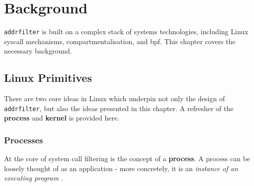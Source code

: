 \section{Background} \label{sec:background}



\texttt{addrfilter} is built on a complex stack of systems technologies,
including Linux syscall mechanisms, compartmentalisation, and \ac{bpf}. This
chapter covers the necessary background.

\subsection{Linux Primitives}

There are two core ideas in Linux which underpin not only the design of
\texttt{addrfilter}, but also the ideas presented in this chapter. A refresher
of the \textbf{process} and \textbf{kernel} is provided here.

\subsubsection{Processes}

At the core of system call filtering is the concept of a \textbf{process}. A
process can be loosely thought of as an application - more concretely, it is an
\textit{instance of an executing program} \cite{LINUX_PROGRAMMING_INTERFACE}.





